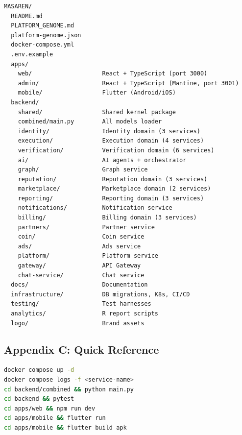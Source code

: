 \begin{verbatim}
MASAREN/
  README.md
  PLATFORM_GENOME.md
  platform-genome.json
  docker-compose.yml
  .env.example
  apps/
    web/                    React + TypeScript (port 3000)
    admin/                  React + TypeScript (Mantine, port 3001)
    mobile/                 Flutter (Android/iOS)
  backend/
    shared/                 Shared kernel package
    combined/main.py        All models loader
    identity/               Identity domain (3 services)
    execution/              Execution domain (4 services)
    verification/           Verification domain (6 services)
    ai/                     AI agents + orchestrator
    graph/                  Graph service
    reputation/             Reputation domain (3 services)
    marketplace/            Marketplace domain (2 services)
    reporting/              Reporting domain (3 services)
    notifications/          Notification service
    billing/                Billing domain (3 services)
    partners/               Partner service
    coin/                   Coin service
    ads/                    Ads service
    platform/               Platform service
    gateway/                API Gateway
    chat-service/           Chat service
  docs/                     Documentation
  infrastructure/           DB migrations, K8s, CI/CD
  testing/                  Test harnesses
  analytics/                R report scripts
  logo/                     Brand assets
\end{verbatim}

\subsection{Appendix C: Quick Reference}

\begin{lstlisting}[language=bash, caption=Common Development Commands]
docker compose up -d
docker compose logs -f <service-name>
cd backend/combined && python main.py
cd backend && pytest
cd apps/web && npm run dev
cd apps/mobile && flutter run
cd apps/mobile && flutter build apk
\end{lstlisting}


